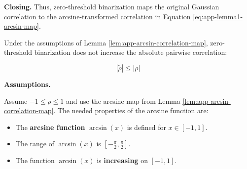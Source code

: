 \noindent\textbf{Closing.}
Thus, zero-threshold binarization maps the original Gaussian correlation to the arcsine-transformed correlation in Equation \ref{eq:app-lemma1-arcsin-map}.


\begin{lemma}\label{lem:app-correlation-contraction}
Under the assumptions of Lemma \ref{lem:app-arcsin-correlation-map}, zero-threshold binarization does not increase the absolute pairwise correlation:

\begin{equation}\label{eq:app-lemma2-correlation-contraction}
| \tilde{\rho} | \leq | \rho |
\end{equation}	
\end{lemma}

\noindent\textbf{Assumptions.}

Assume $ -1 \leq \rho \leq 1 $ and use the arcsine map from Lemma \ref{lem:app-arcsin-correlation-map}. The needed properties of the arcsine function are:

\begin{itemize}
	\setlength\itemsep{-0.5em} %
	\item The \textbf{arcsine function} $ \arcsin(x) $ is defined for $ x \in [-1, 1] $.
	\item The range of $ \arcsin(x) $ is $ [-\frac{\pi}{2}, \frac{\pi}{2}] $.
	\item The function $ \arcsin(x) $ is \textbf{increasing} on $ [-1, 1] $.
\end{itemize}

